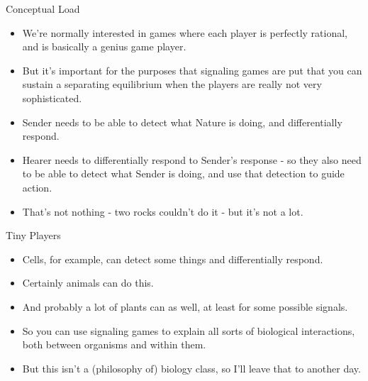 \documentclass[
  ignorenonframetext,
]{beamer}
\providecommand{\tightlist}{%
  \setlength{\itemsep}{0pt}\setlength{\parskip}{0pt}}
\begin{document}
\begin{frame}{Conceptual Load}
\protect\hypertarget{conceptual-load}{}
\begin{itemize}
\tightlist
\item
  We're normally interested in games where each player is perfectly
  rational, and is basically a genius game player.
\item
  But it's important for the purposes that signaling games are put that
  you can sustain a separating equilibrium when the players are really
  not very sophisticated.
\item
  Sender needs to be able to detect what Nature is doing, and
  differentially respond.
\item
  Hearer needs to differentially respond to Sender's response - so they
  also need to be able to detect what Sender is doing, and use that
  detection to guide action.
\item
  That's not nothing - two rocks couldn't do it - but it's not a lot.
\end{itemize}
\end{frame}

\begin{frame}{Tiny Players}
\protect\hypertarget{tiny-players}{}
\begin{itemize}
\tightlist
\item
  Cells, for example, can detect some things and differentially respond.
\item
  Certainly animals can do this.
\item
  And probably a lot of plants can as well, at least for some possible
  signals.
\item
  So you can use signaling games to explain all sorts of biological
  interactions, both between organisms and within them.
\item
  But this isn't a (philosophy of) biology class, so I'll leave that to
  another day.
\end{itemize}
\end{frame}
\end{document}
